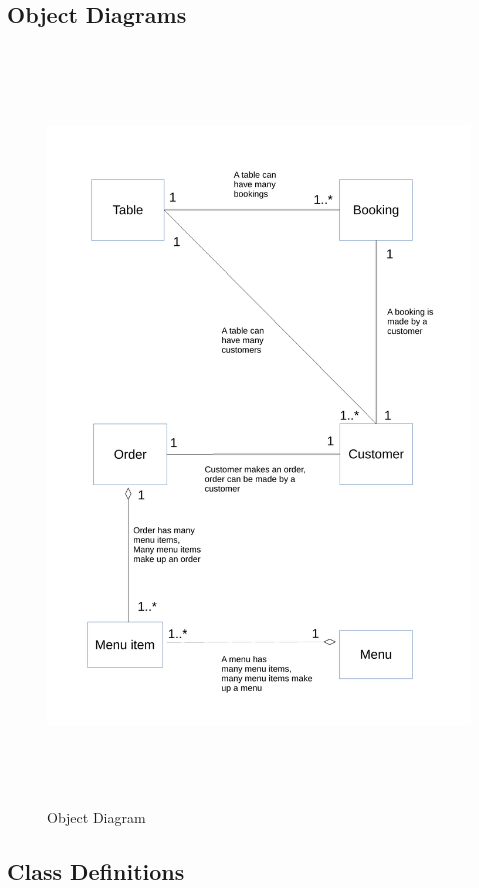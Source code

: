 \subsection{Object Diagrams}

\begin{figure}[H]
    \includegraphics[height = 20cm]{./Design/Images/Objects2}
    \caption{Object Diagram} \label{fig:ObjectsD}
\end{figure}


\subsection{Class Definitions}

